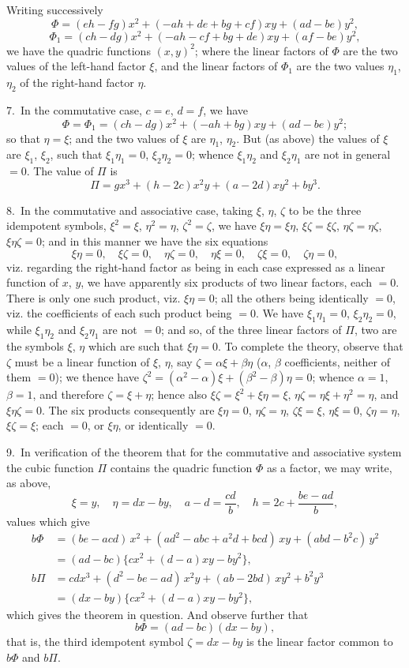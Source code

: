 \documentclass[11pt,a4paper]{article}
\theoremstyle{plain}
\theoremstyle{definition}
\theoremstyle{remark}
\begin{document}
Writing successively
\[
\Phi = (eh-fg)x^2 + (-ah+de+bg+cf)xy + (ad-be)y^2,
\]
\[
\Phi_1 = (ch-dg)x^2 + (-ah-cf+bg+de)xy + (af-be)y^2,
\]
we have the quadric functions $(x,y)^2$; where the linear factors of $\Phi$ are the two values of the left-hand factor $\xi$, and the linear factors of $\Phi_1$ are the two values $\eta_1$, $\eta_2$ of the right-hand factor $\eta$.

7.~In the commutative case, $c=e$, $d=f$, we have
\[
\Phi = \Phi_1 = (ch-dg)x^2 + (-ah+bg)xy + (ad-be)y^2;
\]
so that $\eta = \xi$; and the two values of $\xi$ are $\eta_1$, $\eta_2$. But (as above) the values of $\xi$ are $\xi_1$, $\xi_2$, such that $\xi_1\eta_1=0$, $\xi_2\eta_2=0$; whence $\xi_1\eta_2$ and $\xi_2\eta_1$ are not in general $=0$. The value of $\Pi$ is
\[
\Pi = gx^3 + (h-2c)x^2y + (a-2d)xy^2 + by^3.
\]

8.~In the commutative and associative case, taking $\xi$, $\eta$, $\zeta$ to be the three idempotent symbols, $\xi^2=\xi$, $\eta^2=\eta$, $\zeta^2=\zeta$, we have $\xi\eta=\xi\eta$, $\xi\zeta=\xi\zeta$, $\eta\zeta=\eta\zeta$, $\xi\eta\zeta=0$; and in this manner we have the six equations
\[
\xi\eta=0,\quad \xi\zeta=0,\quad \eta\zeta=0,\quad \eta\xi=0,\quad \zeta\xi=0,\quad \zeta\eta=0,
\]
viz. regarding the right-hand factor as being in each case expressed as a linear function of $x$, $y$, we have apparently six products of two linear factors, each $=0$. There is only one such product, viz. $\xi\eta=0$; all the others being identically $=0$, viz. the coefficients of each such product being $=0$. We have $\xi_1\eta_1=0$, $\xi_2\eta_2=0$, while $\xi_1\eta_2$ and $\xi_2\eta_1$ are not $=0$; and so, of the three linear factors of $\Pi$, two are the symbols $\xi$, $\eta$ which are such that $\xi\eta=0$. To complete the theory, observe that $\zeta$ must be a linear function of $\xi$, $\eta$, say $\zeta=\alpha\xi+\beta\eta$ ($\alpha$, $\beta$ coefficients, neither of them $=0$); we thence have $\zeta^2=(\alpha^2-\alpha)\xi+(\beta^2-\beta)\eta=0$; whence $\alpha=1$, $\beta=1$, and therefore $\zeta=\xi+\eta$; hence also $\xi\zeta=\xi^2+\xi\eta=\xi$, $\eta\zeta=\eta\xi+\eta^2=\eta$, and $\xi\eta\zeta=0$. The six products consequently are $\xi\eta=0$, $\eta\zeta=\eta$, $\zeta\xi=\xi$, $\eta\xi=0$, $\zeta\eta=\eta$, $\xi\zeta=\xi$; each $=0$, or $\xi\eta$, or identically $=0$.

9.~In verification of the theorem that for the commutative and associative system the cubic function $\Pi$ contains the quadric function $\Phi$ as a factor, we may write, as above,
\[
\xi = y,\quad \eta = dx - by,\quad a-d = \frac{cd}{b},\quad h = 2c + \frac{be-ad}{b},
\]
values which give
\begin{align*}
b\Phi &= (be-acd)\,x^2 + (ad^2-abc+a^2d+bcd)\,xy + (abd-b^2c)\,y^2 \\
&= (ad-bc)\{cx^2 + (d-a)xy - by^2\}, \\
b\Pi &= cdx^3 + (d^2-be-ad)\,x^2y + (ab-2bd)\,xy^2 + b^2y^3 \\
&= (dx-by)\{cx^2 + (d-a)xy - by^2\},
\end{align*}
which gives the theorem in question. And observe further that
\[
b\Phi = (ad-bc)(dx-by),
\]
that is, the third idempotent symbol $\zeta = dx-by$ is the linear factor common to $b\Phi$ and $b\Pi$.
\end{document}
